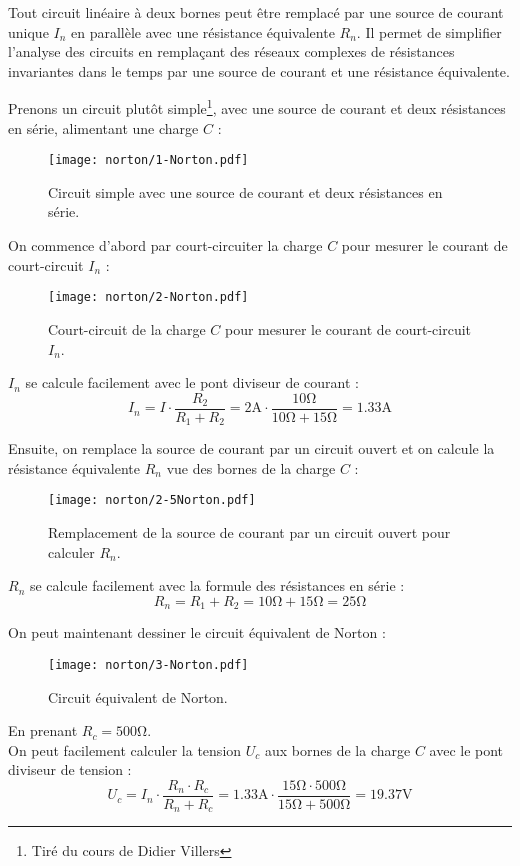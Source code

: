 Tout circuit lin\'eaire à deux bornes peut \^etre remplac\'e par une source de courant
unique \(I_{n}\) en parall\`ele avec une r\'esistance \'equivalente \(R_{n}\). Il permet
de simplifier l’analyse des circuits en remplaçant des r\'eseaux complexes de r\'esistances
invariantes dans le temps par une source de courant et une r\'esistance \'equivalente.

Prenons un circuit plut\^ot simple\footnote{Tir\'e du cours de Didier Villers}, avec une source de courant et deux r\'esistances
en s\'erie, alimentant une charge \(C\) :
\begin{figure}[H]
    \centering
    \texttt{[image: norton/1-Norton.pdf]}
    \caption{Circuit simple avec une source de courant et deux r\'esistances en s\'erie.}
\end{figure}

On commence d'abord par court-circuiter la charge \(C\) pour mesurer le courant de court-circuit \(I_{n}\) :
\begin{figure}[H]
    \centering
    \texttt{[image: norton/2-Norton.pdf]}
    \caption{Court-circuit de la charge \(C\) pour mesurer le courant de court-circuit \(I_{n}\).}
\end{figure}

\(I_{n}\) se calcule facilement avec le pont diviseur de courant :
\[
I_{n} = I \cdot \frac{R_{2}}{R_{1}+R_{2}} = 2\unit{\ampere} \cdot \frac{10\unit{\ohm}}{10\unit{\ohm}+15\unit{\ohm}} = 1.33\unit{\ampere}
\]

Ensuite, on remplace la source de courant par un circuit ouvert et on calcule la
r\'esistance \'equivalente \(R_{n}\) vue des bornes de la charge \(C\) :
\begin{figure}[H]
    \centering
    \texttt{[image: norton/2-5Norton.pdf]}
    \caption{Remplacement de la source de courant par un circuit ouvert pour calculer \(R_{n}\).}
\end{figure}

\(R_{n}\) se calcule facilement avec la formule des r\'esistances en s\'erie :
\[
R_{n} = R_{1} + R_{2} = 10\unit{\ohm} + 15\unit{\ohm} = 25\unit{\ohm}
\]

On peut maintenant dessiner le circuit \'equivalent de Norton :
\begin{figure}[H]
    \centering
    \texttt{[image: norton/3-Norton.pdf]}
    \caption{Circuit \'equivalent de Norton.}
    \label{fig:norton-equivalent}
\end{figure}
En prenant \(R_c=500\unit{\ohm}\).\\
On peut facilement calculer la tension \(U_{c}\) aux bornes de la charge \(C\) avec le pont diviseur de tension :
\[
U_{c} = I_{n} \cdot \frac{R_{n} \cdot R_{c}}{R_{n} + R_{c}} = 1.33\unit{\ampere} \cdot \frac{15\unit{\ohm} \cdot 500\unit{\ohm}}{15\unit{\ohm} + 500\unit{\ohm}} = 19.37\unit{\volt}
\]

